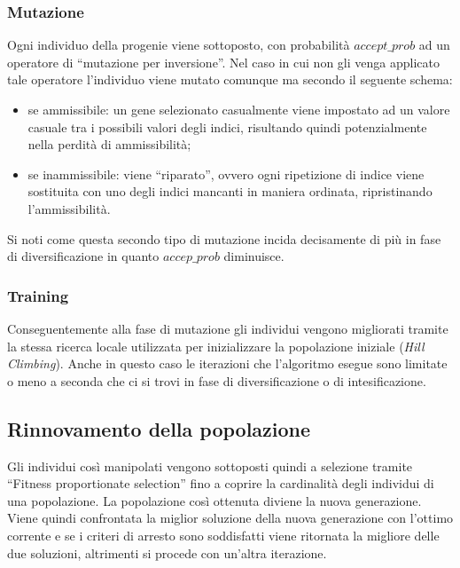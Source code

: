 \documentclass[a4paper]{article}
\begin{document}
            \subsubsection{Mutazione}
                Ogni individuo della progenie viene sottoposto, con probabilit\`a $accept\_prob$ ad un operatore di ``mutazione per inversione''.
                Nel caso in cui non gli venga applicato tale operatore l'individuo viene mutato comunque ma secondo il seguente schema:
                \begin{itemize}
                    \item se ammissibile: un gene selezionato casualmente viene impostato ad un valore casuale tra i possibili valori degli indici,
                        risultando quindi potenzialmente nella perdit\`a di ammissibilit\`a;
                    \item se inammissibile: viene ``riparato'', ovvero ogni ripetizione di indice viene sostituita con uno degli indici mancanti in maniera ordinata,
                        ripristinando l'ammissibilit\`a.
                \end{itemize}

                Si noti come questa secondo tipo di mutazione incida decisamente di pi\`u in fase di diversificazione in quanto $accep\_prob$ diminuisce.

            \subsubsection{Training}
                Conseguentemente alla fase di mutazione gli individui vengono migliorati tramite la stessa ricerca locale utilizzata per inizializzare
                la popolazione iniziale (\emph{Hill Climbing}).
                Anche in questo caso le iterazioni che l'algoritmo esegue sono limitate o meno a seconda che ci si trovi in fase di diversificazione o di intesificazione.

        \subsection{Rinnovamento della popolazione}
            Gli individui cos\`i manipolati vengono sottoposti quindi a selezione tramite ``Fitness proportionate selection'' fino a coprire la
            cardinalit\`a degli individui di una popolazione.
            La popolazione cos\`i ottenuta diviene la nuova generazione.
            Viene quindi confrontata la miglior soluzione della nuova generazione con l'ottimo corrente e se i criteri di arresto sono soddisfatti viene ritornata la migliore delle due soluzioni,
            altrimenti si procede con un'altra iterazione.
\end{document}
